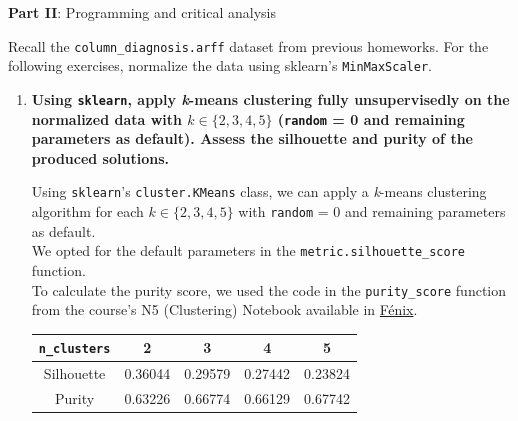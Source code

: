 \documentclass[12pt]{article}
\begin{document}
\vskip 0.5cm

\begin{center}
\large{\textbf{Part II}: Programming and critical analysis}\normalsize
\end{center}

\noindent Recall the \texttt{column\_diagnosis.arff} dataset from previous homeworks. For the following exercises,
normalize the data using sklearn's \texttt{MinMaxScaler}.

\begin{enumerate}[leftmargin=\labelsep]
    \item \textbf{Using \texttt{sklearn}, apply \textit{k}-means clustering fully unsupervisedly on the normalized data with
          $k \in \{2,3,4,5\}$ (\textnormal{\texttt{random} = 0} and remaining parameters as default).
          Assess the silhouette and purity of the produced solutions.}

          \vskip 0.3cm
          Using \texttt{sklearn}'s \texttt{cluster.KMeans} class, we can apply a \textit{k}-means clustering algorithm
          for each $k \in \{2,3,4,5\}$ with \texttt{random} = 0 and remaining parameters as default. \\
          We opted for the default parameters in the \texttt{metric.silhouette\_score} function. \\
          To calculate the purity score, we used the code in the \texttt{purity\_score} function from the
          course's N5 (Clustering) Notebook available in
          \href{https://fenix.tecnico.ulisboa.pt/disciplinas/Apre2/2023-2024/1-semestre/notebooks}{Fénix}.

          

          \begin{center}
              \captionsetup{type=table}
              \begin{tabular}{c|cccc}
                  \texttt{n\_clusters} & 2 & 3 & 4 & 5 \\
                  \hline
                  Silhouette           & 0.36044 & 0.29579 & 0.27442 & 0.23824 \\
                  Purity               & 0.63226 & 0.66774 & 0.66129 & 0.67742
              \end{tabular}
              \label{ex1p-silhouette-purity}
          \end{center}


\end{enumerate}
\end{document}
